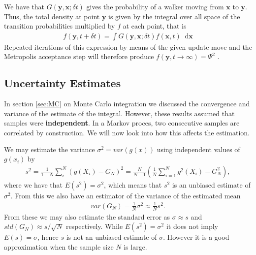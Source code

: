 \documentclass[twoside,english]{uiofysmaster}
\newcommand*\dif{\mathop{}\!\mathrm{d}}
\begin{document}

We have that $G(\bm{y}, \bm{x}; \delta t)$ gives the probability of a
walker moving from $\bm{x}$ to $\bm{y}$. Thus, the total density
at point $\bm{y}$ is given by the
integral over all space of the transition probabilities multiplied by
$f$ at each point, that is
\begin{align}
	f(\bm{y} , t + \delta t) = \int G(\bm{y}, \bm{x}; \delta t)  f(\bm{x}, t) \dif \bm{x}
\end{align}
Repeated iterations of this expression by means of the given update move and the Metropolis acceptance step will therefore produce 
$f (\bm{y}, t \to \infty) = \Psi^2$ \cite{Hammond1994}.

\subsection{Uncertainty Estimates}
In section \ref{sec:MC} on Monte Carlo integration we discussed the convergence and variance of the estimate of the integral. However, these results assumed that samples were \textbf{independent}. In a Markov proces, two consecutive samples are correlated by construction. We will now look into how this affects the estimation.







We may estimate the variance $\sigma^2 = var(g(x))$ using independent values of $g(x_i)$ by
\begin{align}
	s^2 = \frac{1}{1-N} \sum_i^N (g(X_i) - G_N)^2 = \frac{N}{N-1} (  \frac{1}{N} \sum_{i=1}^N g^2(X_i) - G_N^2  ),
\end{align}
where we have that $E(s^2) = \sigma^2 $, which means that $s^2$ is an unbiased estimate of $\sigma^2$. From this we also have an estimator of the variance of the estimated mean
\begin{align}
	var(G_N) = \frac{1}{N} \sigma^2 \approx \frac{1}{N} s^2.
\end{align}
From these we may also estimate the standard error as $\sigma \approx s$ and $std(G_N) \approx s/\sqrt{N}$ respectively. While $E(s^2) = \sigma^2$ it does not imply $E(s) = \sigma$, hence $s$ is not an unbiased estimate of $\sigma$. However it is a good approximation when the sample size $N$ is large.
\end{document}
